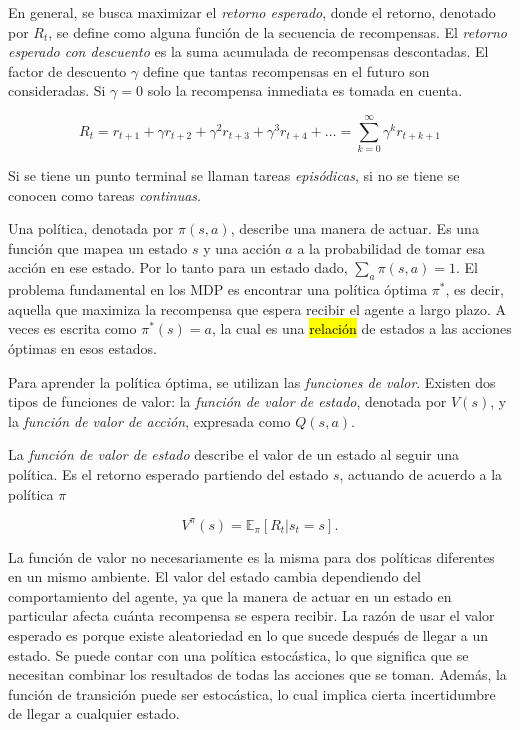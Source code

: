 En general, se busca maximizar el \textit{retorno
esperado}, donde el retorno, denotado por $R_t$, se define como alguna función de la secuencia de recompensas. 
El \textit{retorno esperado con descuento} es la suma acumulada de recompensas descontadas. El factor de descuento $\gamma$
define que tantas recompensas en el 
futuro son consideradas. Si $\gamma = 0$
solo la recompensa inmediata es
tomada en cuenta.

\begin{equation}
\label{eq:retorno-esperado}
R_t = r_{t+1} + \gamma r_{t+2} + \gamma^2 r_{t+3} + \gamma^3 r_{t+4} + \dots = 
\sum_{k = 0}^\infty \gamma^{k} r_{t+k+1}
\end{equation}

Si se tiene un punto terminal se llaman tareas \textit{episódicas}, si no se tiene se conocen como tareas \textit{continuas}.


Una política, denotada por $\pi(s, a)$, describe una manera de actuar. Es una función que mapea un estado $s$ y una acción $a$ a la probabilidad de tomar esa acción en ese estado.
Por lo tanto para un estado dado, 
$\sum_a \pi (s, a) = 1$. El problema fundamental en los MDP es encontrar una política óptima $\pi^*$, es decir, aquella que maximiza la recompensa que espera recibir el agente a largo plazo.
A veces es escrita como $\pi^*(s) = a$, la cual es una \hl{relación} de estados a las acciones óptimas en esos estados.

Para aprender la política óptima, se utilizan las \textit{funciones de valor}. Existen dos tipos de funciones de valor: la \textit{función de valor de estado},
denotada por $V(s)$, y la \textit{función de valor de acción}, expresada como $Q(s, a)$.

La \textit{función de valor de estado} describe el valor de un estado al seguir una política. Es el retorno esperado partiendo del estado $s$, actuando de acuerdo
a la política $\pi$

\begin{equation}\label{eq:state-value-func}
V^\pi(s) = \mathbb{E}_\pi[R_t | s_t = s].    
\end{equation}


La función de valor no necesariamente es la misma para dos políticas diferentes
en un mismo ambiente.  El valor del estado
cambia dependiendo del comportamiento del agente, ya que la manera de actuar
en un estado en particular afecta cuánta recompensa se espera recibir.
La razón de usar el valor esperado  es porque existe aleatoriedad en lo que
sucede después de llegar a un estado. Se puede contar con una política estocástica, lo que significa que se necesitan combinar los resultados de 
todas las acciones que se toman. Además, la función de transición puede ser estocástica, lo cual implica cierta incertidumbre de llegar a cualquier 
estado.

